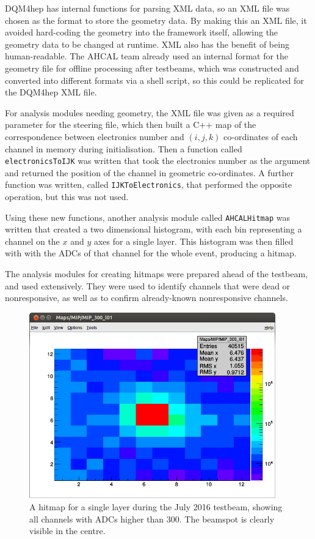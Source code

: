 \acrshort{DQM4hep} has internal functions for parsing \acrshort{XML} data, so an \acrshort{XML} file was chosen as the format to store the geometry data. By making this an \acrshort{XML} file, it avoided hard-coding the geometry into the framework itself, allowing the geometry data to be changed at runtime. \acrshort{XML} also has the benefit of being human-readable. The AHCAL team already used an internal format for the geometry file for offline processing after testbeams, which was constructed and converted into different formats via a  shell script, so this could be replicated for the \acrshort{DQM4hep} \acrshort{XML} file.

For analysis modules needing geometry, the \acrshort{XML} file was given as a required parameter for the steering file, which then built a C++ map of the correspondence between electronics number and $(i,j,k)$ co-ordinates of each channel in memory during initialisation. Then a function called \texttt{electronicsToIJK} was written that took the electronics number as the argument and returned the position of the channel in geometric co-ordinates. A further function was written, called \texttt{IJKToElectronics}, that performed the opposite operation, but this was not used. 

Using these new functions, another analysis module called \texttt{AHCALHitmap} was written that created a two dimensional histogram, with each bin representing a channel on the $x$ and $y$ axes for a single layer. This histogram was then filled with with the \acrshort{ADC}s of that channel for the whole event, producing a hitmap.

The analysis modules for creating hitmaps were prepared ahead of the testbeam, and used extensively. They were used to identify channels that were dead or nonresponsive, as well as to confirm already-known nonresponsive channels.

\begin{figure}[p]
	\centering
	\includegraphics[width=0.95\textwidth]{../Pictures/AHCALHitmapSingle.png}
	\caption{A hitmap for a single layer during the July 2016 testbeam, showing all channels with \acrshort{ADC}s higher than 300. The beamspot is clearly visible in the centre.}
	\label{figure:aida/july2016/single-hitmap}
\end{figure}

